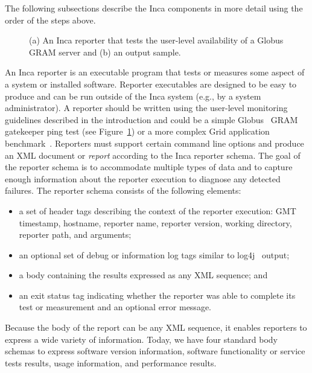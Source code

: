 \documentclass[times,10pt,twocolumn]{article}
\begin{document}
\noindent The following subsections describe the Inca components in more
detail using the order of the steps above.


\lstset{
  basicstyle=\scriptsize\ttfamily, 
  frame=single,
  keywordstyle=\textbf, 
  identifierstyle=, 
  commentstyle=\scriptsize\ttfamily, 
  stringstyle=\ttfamily, 
  numbers=left, 
  numberstyle=\scriptsize,
  stepnumber=2,
  firstnumber=1,
  showstringspaces=false} 
\begin{figure}[tbp]
\lstset{language=Perl} 
\subfigure[]{}
\subfigure[]{}
\caption{\label{pingReporter}(a) An Inca reporter that tests the user-level
availability of a Globus GRAM server and (b) an output sample.}
\end{figure}

An Inca reporter is an executable program that tests or measures some aspect
of a system or installed software.   Reporter executables are designed to be
easy to produce and can be run outside of the Inca system (e.g., by a system
administrator).  A reporter should be written using the user-level
monitoring guidelines described in the introduction and could be a simple
Globus~\cite{globus} GRAM gatekeeper ping test (see Figure~\ref{pingReporter})
or a more complex Grid application benchmark~\cite{grasp}.  Reporters must
support certain command line options and produce an XML document or
\emph{report}
according to the Inca reporter schema.  The goal of the reporter schema is to
accommodate multiple types of data and to capture enough information about the
reporter execution to diagnose any detected failures.  The reporter schema
consists of the following elements: 

\begin{itemize}
\item a set of header tags describing the context of the reporter
execution:  GMT timestamp, hostname, reporter name, reporter version, working
directory, reporter path, and arguments;
\item an optional set of debug or information log tags similar to log4j~\cite{log4j} output;
\item a body containing the results expressed as any XML sequence; and
\item an exit status tag
indicating whether the reporter was able to complete its test or measurement
and an optional error message.  
\end{itemize} 
\noindent Because the body of the report can be any XML sequence, it enables
reporters to express a wide variety of information.  Today, we have four
standard body schemas to express software version information, software
functionality or service tests results, usage information, and performance
results.  
\end{document}
